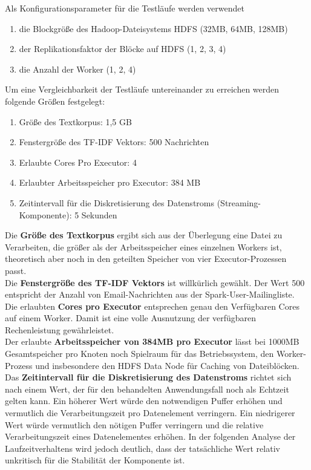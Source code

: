 Als Konfigurationsparameter für die Testläufe werden verwendet
\begin{enumerate}
	\item die Blockgröße des Hadoop-Dateisystems HDFS (32MB, 64MB, 128MB)
	\item der Replikationsfaktor der Blöcke auf HDFS (1, 2, 3, 4)
	\item die Anzahl der Worker (1, 2, 4)
\end{enumerate}

Um eine Vergleichbarkeit der Testläufe untereinander zu erreichen werden folgende Größen festgelegt:
\begin{enumerate}
	\item Größe des Textkorpus: 1,5 GB
	\item Fenstergröße des TF-IDF Vektors: 500 Nachrichten
	\item Erlaubte Cores Pro Executor: 4
	\item Erlaubter Arbeitsspeicher pro Executor: 384 MB
	\item Zeitintervall für die Diskretisierung des Datenstroms (Streaming-Komponente): 5 Sekunden
\end{enumerate}

Die \textbf{Größe des Textkorpus} ergibt sich aus der Überlegung eine Datei zu Verarbeiten, die größer als der Arbeitsspeicher eines einzelnen Workers ist, theoretisch aber noch in den geteilten Speicher von vier Executor-Prozessen passt.\\

Die \textbf{Fenstergröße des TF-IDF Vektors} ist willkürlich gewählt. Der Wert 500 entspricht der Anzahl von Email-Nachrichten aus der Spark-User-Mailingliste.\\

Die erlaubten \textbf{Cores pro Executor} entsprechen genau den Verfügbaren Cores auf einem Worker. Damit ist eine volle Ausnutzung der verfügbaren Rechenleistung gewährleistet.\\

Der erlaubte \textbf{Arbeitsspeicher von 384MB pro Executor} lässt bei 1000MB Gesamtspeicher pro Knoten noch Spielraum für das Betriebssystem, den Worker-Prozess und insbesondere den HDFS Data Node für Caching von Dateiblöcken.\\

Das \textbf{Zeitintervall für die Diskretisierung des Datenstroms} richtet sich nach einem Wert, der für den behandelten Anwendungsfall noch als Echtzeit gelten kann.
Ein höherer Wert würde den notwendigen Puffer erhöhen und vermutlich die Verarbeitungszeit pro Datenelement verringern. Ein niedrigerer Wert würde vermutlich den nötigen Puffer verringern und die relative Verarbeitungszeit eines Datenelementes erhöhen. In der folgenden Analyse der Laufzeitverhaltens wird jedoch deutlich, dass der tatsächliche Wert relativ unkritisch für die Stabilität der Komponente ist.\\

